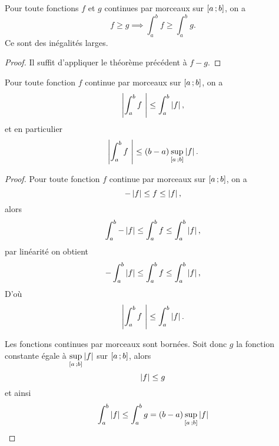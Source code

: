 \begin{theo}
   Pour toute fonctions $f$ et $g$ continues par morceaux sur $\left[ a \, ;  b \right]$, on a
  \begin{equation}
    f \geq g \implies \int_a^b f \geq \int_a^b g.
  \end{equation}
  \danger Ce sont des inégalités larges.
\end{theo}
\begin{proof}
  Il suffit d'appliquer le théorème précédent à $f-g$.
\end{proof}

\begin{theo}
  Pour toute fonction $f$ continue par morceaux sur $\left[ a \, ;  b \right]$, on a
  \begin{equation}
    \left\lvert\int_a^b f~\right\rvert \leq \int_a^b \left\lvert f\right\rvert,
  \end{equation}
  et en particulier
  \begin{equation}
    \left\lvert\int_a^b f~\right\rvert \leq (b-a) \sup\limits_{\left[ a \, ;  b \right]} \left\lvert f\right\rvert.
  \end{equation}
\end{theo}
\begin{proof}
  Pour toute fonction $f$ continue par morceaux sur $\left[ a \, ;  b \right]$, on a
  \begin{equation}
    -\left\lvert f\right\rvert \leq f \leq \left\lvert f\right\rvert,
  \end{equation}
  alors
  \begin{equation}
    \int_a^b -\left\lvert f\right\rvert \leq \int_a^bf \leq \int_a^b\left\lvert f\right\rvert,
  \end{equation}
  par linéarité on obtient
  \begin{equation}
    -\int_a^b \left\lvert f\right\rvert \leq \int_a^bf \leq \int_a^b\left\lvert f\right\rvert,
  \end{equation}
  D'où
  \begin{equation}
     \left\lvert\int_a^b f~\right\rvert \leq \int_a^b \left\lvert f\right\rvert.
  \end{equation}

  Les fonctions continues par morceaux sont bornées. Soit donc $g$ la fonction constante égale à $\sup\limits_{\left[ a \, ;  b \right]} \left\lvert f\right\rvert$ sur $\left[ a \, ;  b \right]$, alors
  \begin{equation}
    \left\lvert f\right\rvert \leq g
  \end{equation}
  et ainsi
  \begin{equation}
    \int_a^b \left\lvert f\right\rvert \leq \int_a^b g = (b-a) \sup\limits_{\left[ a \, ;  b \right]} \left\lvert f\right\rvert
  \end{equation}
\end{proof}

